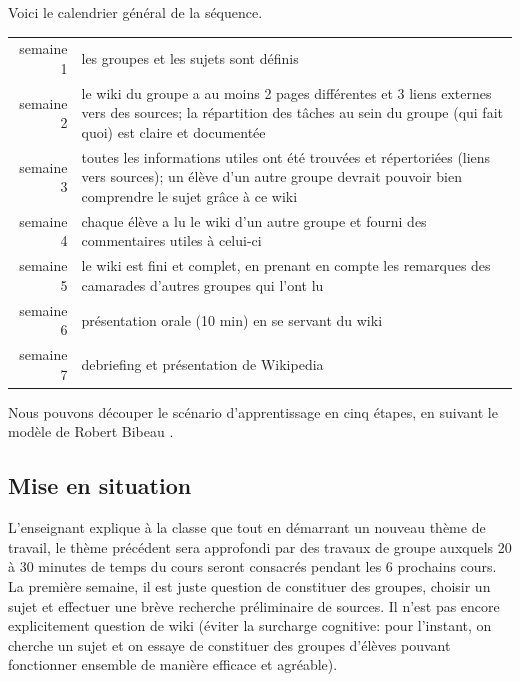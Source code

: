 \documentclass[11pt,bibliography=totoc]{scrartcl}
\begin{document}
Voici le calendrier général de la séquence.
\begin{center}
\begin{tabular}{rp{}}
  semaine 1& les groupes et les sujets sont définis\\
  semaine 2& le wiki du groupe a au moins 2 pages différentes et 3 liens
             externes vers des sources;
             la répartition des tâches au sein du groupe (qui fait quoi) est claire et documentée\\
  semaine 3& toutes les informations utiles ont été trouvées et répertoriées
             (liens vers sources);
             un élève d'un autre groupe devrait pouvoir bien comprendre le sujet grâce à ce wiki\\
  semaine 4& chaque élève a lu le wiki d'un autre groupe et fourni des commentaires utiles à celui-ci\\
  semaine 5& le wiki est fini et complet, en prenant en compte les remarques des
             camarades d'autres groupes qui l'ont lu\\
  semaine 6& présentation orale (10 min) en se servant du wiki \\
  semaine 7& debriefing et présentation de Wikipedia
\end{tabular}  
\end{center}

Nous pouvons découper le scénario d'apprentissage en cinq étapes, en suivant le
modèle de Robert Bibeau \autocite{bibeau}.

\subsection{Mise en situation}
L'enseignant explique à la classe que tout en démarrant un nouveau thème de
travail, le thème précédent sera approfondi par des travaux de groupe auxquels
20 à 30 minutes de temps du cours seront consacrés pendant les 6 prochains cours.
La première semaine, il est juste question de constituer des groupes, choisir un
sujet et effectuer une brève recherche préliminaire de sources. Il n'est pas
encore explicitement question de wiki (éviter la surcharge cognitive: pour
l'instant, on cherche un sujet et on essaye de constituer des groupes d'élèves
pouvant fonctionner ensemble de manière efficace et agréable).
\end{document}
